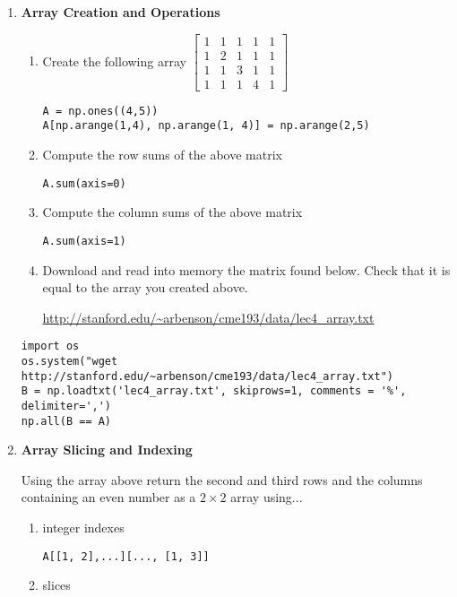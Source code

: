 \documentclass{article}
\begin{document}
\pagestyle{fancy}
\begin{enumerate}

\item \textbf{Array Creation and Operations}
\begin{enumerate}
\item 
Create the following array
$\begin{bmatrix}
1 & 1 & 1 & 1 & 1\\
1 & 2 & 1 & 1 & 1\\
1 & 1 & 3 & 1 & 1\\
1 & 1 & 1 & 4 & 1
\end{bmatrix}$
\begin{verbatim}
A = np.ones((4,5))
A[np.arange(1,4), np.arange(1, 4)] = np.arange(2,5)
\end{verbatim}
\item  Compute the row sums of the above matrix 

\texttt{A.sum(axis=0)}

\item Compute the column sums of the above matrix

\texttt{A.sum(axis=1)}

\item
Download and read into memory the matrix found below. Check that it is equal to the array you created above. 
\begin{center}
\url{http://stanford.edu/~arbenson/cme193/data/lec4_array.txt}
\end{center}
\end{enumerate}

\begin{verbatim}
import os
os.system("wget http://stanford.edu/~arbenson/cme193/data/lec4_array.txt")
B = np.loadtxt('lec4_array.txt', skiprows=1, comments = '%', delimiter=',') 
np.all(B == A)
\end{verbatim}

\item{\textbf{Array Slicing and Indexing}}

Using the array above return the second and third rows and the columns containing an even number as a $2 \times  2$ array using... 
\begin{enumerate}
\item integer indexes

\texttt{A[[1, 2],...][..., [1, 3]]}

\item slices


\end{enumerate}
\end{enumerate}
\end{document}

